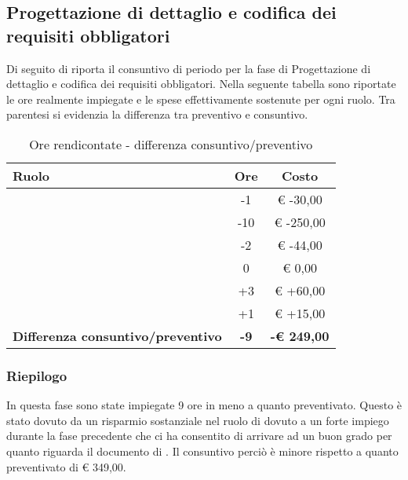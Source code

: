 


	\subsection{Progettazione di dettaglio e codifica dei requisiti obbligatori} %
	\label{sub:consuntivo_progettazione_di_dettaglio_e_codifica_dei_requisiti_obbligatori}
		Di seguito di riporta il consuntivo di periodo per la fase di Progettazione di dettaglio e codifica dei requisiti obbligatori. \newline
		Nella seguente tabella sono riportate le ore realmente impiegate e le spese effettivamente sostenute per ogni ruolo. Tra parentesi si evidenzia la differenza tra preventivo e consuntivo.
		\begin{table}[!h]
			\begin{center}
				\begin{tabularx}{0.90\textwidth}{|X|c|c|}
					\hline
					\textbf{Ruolo} & \textbf{Ore} & \textbf{Costo} \\
					\hline
					\roleProjectManager & -1 & \euro{} -30,00 \\
					\hline
					\roleAnalyst & -10 &  \euro{} -250,00 \\
					\hline
					\roleDesigner & -2 & \euro{} -44,00 \\
					\hline
					\roleAdministrator & 0  & \euro{} 0,00 \\
					\hline
					\roleProgrammer & +3 & \euro{} +60,00 \\
					\hline
					\roleVerifier & +1 & \euro{} +15,00 \\
					\hline
					\textbf{Differenza consuntivo/preventivo} & \textbf{-9} & \textbf{-\euro{} 249,00} \\
					\hline
				\end{tabularx}
			\end{center}
		\caption{Ore rendicontate - differenza consuntivo/preventivo}
		\end{table}

		\subsubsection{Riepilogo} %
		In questa fase sono state impiegate 9 ore in meno a quanto preventivato. \newline
		Questo è stato dovuto da un risparmio sostanziale nel ruolo di \roleAnalyst{} dovuto a un forte impiego durante la fase precedente che ci ha consentito di arrivare ad un buon grado per quanto riguarda il documento di \docNameVersionAdR. \newline
		Il consuntivo perciò è minore rispetto a quanto preventivato di \euro{} 349,00.

